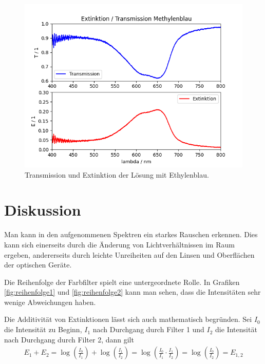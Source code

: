 \documentclass{article}
\begin{document}
\begin{figure}[H]
\centering
\caption{Transmission und Extinktion der Lösung mit Ethylenblau.}
\label{fig:Trans_Ex_Methyl}
\includegraphics[scale=0.7]{Transmission_Extinktion_Methyl.png}

\end{figure}


\section{Diskussion}

Man kann in den aufgenommenen Spektren ein starkes Rauschen erkennen. Dies kann sich einerseits durch die Änderung von Lichtverhältnissen im Raum ergeben, andererseits durch leichte Unreiheiten auf den Linsen und Oberflächen der optischen Geräte.

Die Reihenfolge der Farbfilter spielt eine untergeordnete Rolle. In Grafiken \ref{fig:reihenfolge1} und \ref{fig:reihenfolge2} kann man sehen, dass die Intensitäten sehr wenige Abweichungen haben.

Die Additivität von Extinktionen lässt sich auch mathematisch begründen. Sei $I_0$ die Intensität zu Beginn, $I_1$ nach Durchgang durch Filter 1 und $I_2$ die Intensität nach Durchgang durch Filter 2, dann gilt
\begin{align*}
E_1 + E_2 = \log\left(\frac{I_0}{I_1}\right) + \log\left(\frac{I_1}{I_2}\right) = \log\left(\frac{I_0}{I_1}\cdot \frac{I_1}{I_2}\right) = \log\left(\frac{I_0}{I_2}\right) = E_{1,2}
\end{align*}
\end{document}
